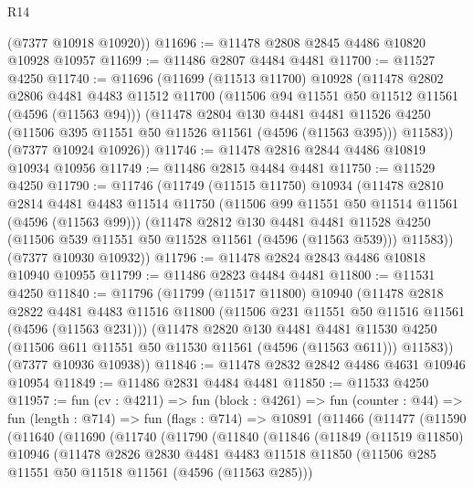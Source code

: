 \begin{lexlean}{R14}
\begin{coremodule}
      (@7377 @10918 @10920))
@11696 := @11478 @2808 @2845 @4486 @10820 @10928 @10957
@11699 := @11486 @2807 @4484 @4481
@11700 := @11527 @4250
@11740 := @11696
    (@11699
      (@11513 @11700)
      @10928
      (@11478
        @2802
        @2806
        @4481
        @4483
        @11512
        @11700
        (@11506 @94 @11551 @50 @11512 @11561 (@4596 (@11563 @94)))
        (@11478
          @2804
          @130
          @4481
          @4481
          @11526
          @4250
          (@11506 @395 @11551 @50 @11526 @11561 (@4596 (@11563 @395)))
          @11583))
      (@7377 @10924 @10926))
@11746 := @11478 @2816 @2844 @4486 @10819 @10934 @10956
@11749 := @11486 @2815 @4484 @4481
@11750 := @11529 @4250
@11790 := @11746
    (@11749
      (@11515 @11750)
      @10934
      (@11478
        @2810
        @2814
        @4481
        @4483
        @11514
        @11750
        (@11506 @99 @11551 @50 @11514 @11561 (@4596 (@11563 @99)))
        (@11478
          @2812
          @130
          @4481
          @4481
          @11528
          @4250
          (@11506 @539 @11551 @50 @11528 @11561 (@4596 (@11563 @539)))
          @11583))
      (@7377 @10930 @10932))
@11796 := @11478 @2824 @2843 @4486 @10818 @10940 @10955
@11799 := @11486 @2823 @4484 @4481
@11800 := @11531 @4250
@11840 := @11796
    (@11799
      (@11517 @11800)
      @10940
      (@11478
        @2818
        @2822
        @4481
        @4483
        @11516
        @11800
        (@11506 @231 @11551 @50 @11516 @11561 (@4596 (@11563 @231)))
        (@11478
          @2820
          @130
          @4481
          @4481
          @11530
          @4250
          (@11506 @611 @11551 @50 @11530 @11561 (@4596 (@11563 @611)))
          @11583))
      (@7377 @10936 @10938))
@11846 := @11478 @2832 @2842 @4486 @4631 @10946 @10954
@11849 := @11486 @2831 @4484 @4481
@11850 := @11533 @4250
@11957 := fun (cv : @4211) =>
  fun (block : @4261) =>
  fun (counter : @44) =>
  fun (length : @714) =>
  fun (flags : @714) =>
  @10891
    (@11466
      (@11477
        (@11590
          (@11640
            (@11690
              (@11740
                (@11790
                  (@11840
                    (@11846
                      (@11849
                        (@11519 @11850)
                        @10946
                        (@11478
                          @2826
                          @2830
                          @4481
                          @4483
                          @11518
                          @11850
                          (@11506 @285 @11551 @50 @11518 @11561 (@4596 (@11563 @285)))

\end{coremodule}
\end{lexlean}
